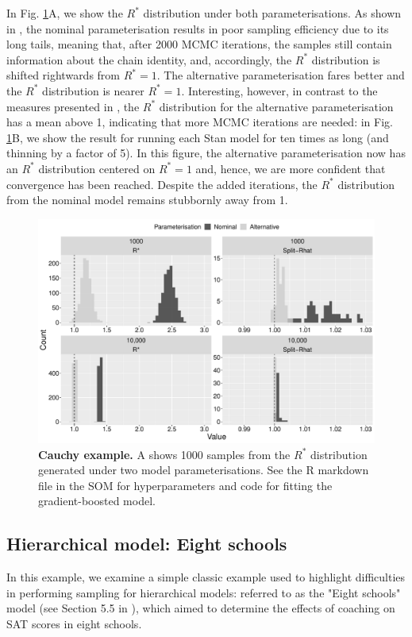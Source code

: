 \documentclass{article}
\begin{document}
In Fig. \ref{fig:cauchy}A, we show the $R^*$ distribution under both parameterisations. As shown in \cite{vehtari2019rank}, the nominal parameterisation results in poor sampling efficiency due to its long tails, meaning that, after 2000 MCMC iterations, the samples still contain information about the chain identity, and, accordingly, the $R^*$ distribution is shifted rightwards from $R^*=1$. The alternative parameterisation fares better and the $R^*$ distribution is nearer $R^*=1$. Interesting, however, in contrast to the measures presented in \cite{vehtari2019rank}, the $R^*$ distribution for the alternative parameterisation has a mean above 1, indicating that more MCMC iterations are needed: in Fig. \ref{fig:cauchy}B, we show the result for running each Stan model for ten times as long (and thinning by a factor of 5). In this figure, the alternative parameterisation now has an $R^*$ distribution centered on $R^*=1$ and, hence, we are more confident that convergence has been reached. Despite the added iterations, the $R^*$ distribution from the nominal model remains stubbornly away from 1.

\begin{figure}[h]
	\centerline{\includegraphics[width=1.0\textwidth]{../output/cauchy.pdf}}
	\caption{\textbf{Cauchy example.} A shows 1000 samples from the $R^*$ distribution generated under two model parameterisations. See the R markdown file in the SOM for hyperparameters and code for fitting the gradient-boosted model.}
	\label{fig:cauchy}
\end{figure}

\subsection{Hierarchical model: Eight schools}
In this example, we examine a simple classic example used to highlight difficulties in performing sampling for hierarchical models: referred to as the "Eight schools" model (see Section 5.5 in \cite{gelman2013bayesian}), which aimed to determine the effects of coaching on SAT scores in eight schools. 
\end{document}
